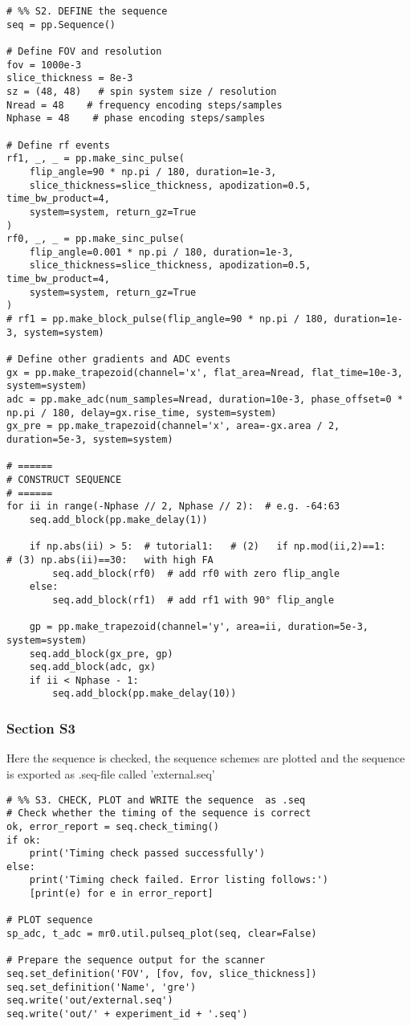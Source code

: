 \documentclass[a4paper,12pt]{extarticle}
\begin{document}
\begin{verbatim}
# %% S2. DEFINE the sequence
seq = pp.Sequence()

# Define FOV and resolution
fov = 1000e-3
slice_thickness = 8e-3
sz = (48, 48)   # spin system size / resolution
Nread = 48    # frequency encoding steps/samples
Nphase = 48    # phase encoding steps/samples

# Define rf events
rf1, _, _ = pp.make_sinc_pulse(
    flip_angle=90 * np.pi / 180, duration=1e-3,
    slice_thickness=slice_thickness, apodization=0.5, time_bw_product=4,
    system=system, return_gz=True
)
rf0, _, _ = pp.make_sinc_pulse(
    flip_angle=0.001 * np.pi / 180, duration=1e-3,
    slice_thickness=slice_thickness, apodization=0.5, time_bw_product=4,
    system=system, return_gz=True
)
# rf1 = pp.make_block_pulse(flip_angle=90 * np.pi / 180, duration=1e-3, system=system)

# Define other gradients and ADC events
gx = pp.make_trapezoid(channel='x', flat_area=Nread, flat_time=10e-3, system=system)
adc = pp.make_adc(num_samples=Nread, duration=10e-3, phase_offset=0 * np.pi / 180, delay=gx.rise_time, system=system)
gx_pre = pp.make_trapezoid(channel='x', area=-gx.area / 2, duration=5e-3, system=system)

# ======
# CONSTRUCT SEQUENCE
# ======
for ii in range(-Nphase // 2, Nphase // 2):  # e.g. -64:63
    seq.add_block(pp.make_delay(1))

    if np.abs(ii) > 5:  # tutorial1:   # (2)   if np.mod(ii,2)==1:    # (3) np.abs(ii)==30:   with high FA
        seq.add_block(rf0)  # add rf0 with zero flip_angle
    else:
        seq.add_block(rf1)  # add rf1 with 90° flip_angle

    gp = pp.make_trapezoid(channel='y', area=ii, duration=5e-3, system=system)
    seq.add_block(gx_pre, gp)
    seq.add_block(adc, gx)
    if ii < Nphase - 1:
        seq.add_block(pp.make_delay(10))
\end{verbatim}

\subsubsection{Section S3}
Here the sequence is checked, the sequence schemes are plotted and the sequence is exported as .seq-file called 'external.seq'
\begin{verbatim}
# %% S3. CHECK, PLOT and WRITE the sequence  as .seq
# Check whether the timing of the sequence is correct
ok, error_report = seq.check_timing()
if ok:
    print('Timing check passed successfully')
else:
    print('Timing check failed. Error listing follows:')
    [print(e) for e in error_report]

# PLOT sequence
sp_adc, t_adc = mr0.util.pulseq_plot(seq, clear=False)

# Prepare the sequence output for the scanner
seq.set_definition('FOV', [fov, fov, slice_thickness])
seq.set_definition('Name', 'gre')
seq.write('out/external.seq')
seq.write('out/' + experiment_id + '.seq')
\end{verbatim}
\end{document}
